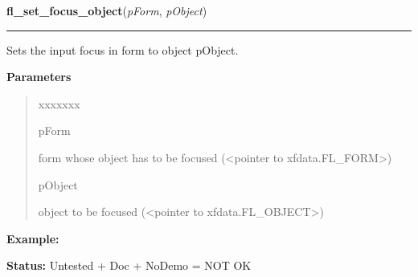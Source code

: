 \hspace{.8\funcindent}\begin{boxedminipage}{\funcwidth}

    \raggedright \textbf{fl\_set\_focus\_object}(\textit{pForm}, \textit{pObject})

    \vspace{-1.5ex}

    \rule{\textwidth}{0.5\fboxrule}
\setlength{\parskip}{2ex}
    Sets the input focus in form to object pObject.

\setlength{\parskip}{1ex}
      \textbf{Parameters}
      \vspace{-1ex}

      \begin{quote}
        \begin{Ventry}{xxxxxxx}

          \item[pForm]

          form whose object has to be focused ({\textless}pointer to 
          xfdata.FL\_FORM{\textgreater})

          \item[pObject]

          object to be focused ({\textless}pointer to 
          xfdata.FL\_OBJECT{\textgreater})

        \end{Ventry}

      \end{quote}

\textbf{Example:} 

\textbf{Status:} Untested + Doc + NoDemo = NOT OK



    \end{boxedminipage}

    \label{xformslib:library:fl_set_focus_object}

    \vspace{0.5ex}

